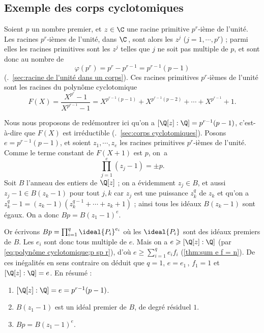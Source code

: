 \documentclass[11pt, useosf,
  title in boldface,
  theorem in new line,
  theorem numbering = section,
  number theorems separately,
]{simplivre}
\begin{document}
    \subsection*{Exemple des corps cyclotomiques}
        Soient \( p \) un nombre premier, et \( z \in \C \) une racine primitive \( p^r \)‑ième de l'unité. Les racines \( p^r \)‑ièmes de l'unité, dans \( \C \)\,, sont alors les \( z^j \) (\( j = 1, \cdots, p^r \)) ; parmi elles les racines primitives sont les \( z^j \) telles que \( j \) ne soit pas multiple de \( p \), et sont donc au nombre de
        \[
            \varphi(p^r) = p^r - p^{r-1} = p^{r-1}(p-1)
        \]
        (\cf.~\cref{sec:racine de l'unité dans un corps}). Ces racines primitives \( p^r \)‑ièmes de l'unité sont les racines du polynôme cyclotomique
        \begin{equation}\label{eq:polynôme cyclotomique;p sp r}
            F(X) = \frac{X^{p^r}-1}{X^{p^{r-1}}-1} = X^{p^{r-1}(p-1)} + X^{p^{r-1}(p-2)} + \cdots + X^{p^{r-1}} + 1.
        \end{equation}

        Nous nous proposons de redémontrer ici qu'on a \( [ \Q[z] : \Q ] = p^{r-1}(p-1) \), c'est-à-dire que \( F(X) \) est irréductible (\cf.~\cref{sec:corps cyclotomiques}). Posons \( e = p^{r-1}(p-1) \), et soient \( z_1, \cdots, z_e \) les racines primitives \( p^r \)‑ièmes de l'unité. Comme le terme constant de \( F(X+1) \) est \( p \), on~a
        \[
            \prod_{j=1}^e (z_j-1) = \pm p.
        \]
        Soit \( B \) l'anneau des entiers de \( \Q[z] \) ; on a évidemment \( z_j \in B \), et aussi \( z_j-1 \in B(z_k-1) \) pour tout \( j,k \) car \( z_j \) est une puissance \( z_k^q \) de \( z_k \) et qu'on a \( z_k^q-1 = (z_k-1)(z_k^{q-1} + \cdots + z_k + 1) \) ;  ainsi tous les idéaux \( B(z_k-1) \) sont égaux. On a donc \( B p = B(z_1-1)^e \).

        Or écrivons \( B p = \prod_{i=1}^q \ideal{P_i}^{e_i} \) où les \( \ideal{P_i} \) sont des idéaux premiers de \( B \). Les \( e_i \) sont donc tous multiple de \( e \). Mais on a \( e \geqslant [ \Q[z] : \Q ] \) (par \eqref{eq:polynôme cyclotomique;p sp r}), d'où \( e \geqslant \sum_{i=1}^q e_i f_i \) (\cref{thm:sum e f = n}). De ces inégalités en sens contraire on déduit que \( q = 1 \), \( e = e_1 \)\,, \( f_1 = 1 \) et \( [ \Q[z] : \Q ] = e \). En résumé :
        \begin{enumerate}
            \item \( [ \Q[z] : \Q ] = e = p^{r-1}(p-1) \).
            \item \( B(z_1-1) \) est un idéal premier de \( B \), de degré résiduel \( 1 \).
            \item \( Bp = B(z_1-1)^e \).
        \end{enumerate}
\end{document}
